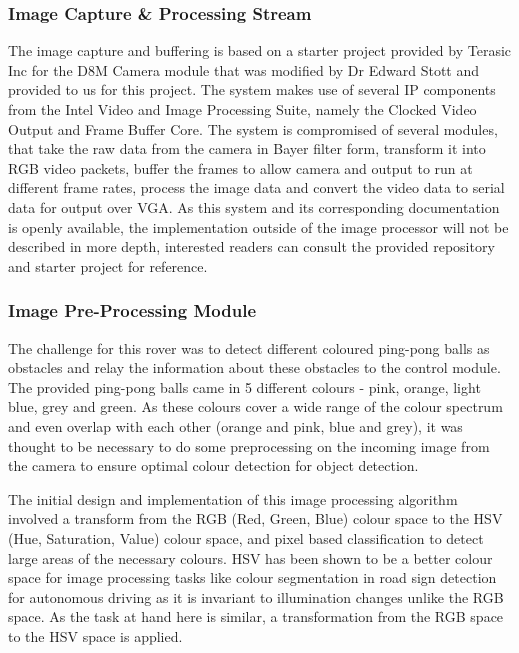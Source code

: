 \documentclass[a4paper]{article}
\begin{document}
\subsubsection{Image Capture \& Processing Stream}

The image capture and buffering is based on a starter project provided
by Terasic Inc for the D8M Camera module that was modified by Dr Edward Stott 
\cite{EEE2Rover} and provided to us for this project. The system makes use of 
several IP components from the Intel Video and Image Processing Suite,
namely the Clocked Video Output and Frame Buffer Core. The system is compromised
of several modules, that take the raw data from the camera in Bayer filter form\cite{TerasicD8MWeb},
transform it into RGB video packets, buffer the frames to allow camera and output
to run at different frame rates, process the image data and convert the video 
data to serial data for output over VGA.\cite{EEE2Rover} As this system and its 
corresponding documentation is openly available, the implementation outside of 
the image processor will not be described in more depth, interested readers can 
consult the provided repository and starter project for reference. 

\subsubsection{Image Pre-Processing Module}

The challenge for this rover was to detect different coloured ping-pong balls as
obstacles and relay the information about these obstacles to the control module. 
The provided ping-pong balls came in 5 different colours - pink, orange, light 
blue, grey and green. As these colours cover a wide range of the colour spectrum
and even overlap with each other (orange and pink, blue and grey), it was thought 
to be necessary to do some preprocessing on the incoming image from the camera 
to ensure optimal colour detection for object detection.  
 


The initial design and implementation of this image processing algorithm involved
a transform from the RGB (Red, Green, Blue) colour space to the HSV (Hue, 
Saturation, Value) colour space, and pixel based classification to detect large
areas of the necessary colours.  HSV has been shown to be a better colour space
for image processing tasks like colour segmentation in road sign detection for 
autonomous driving as it is invariant to illumination changes unlike the RGB 
space.\cite{ali2013performance} As the task at hand here is similar, a transformation
from the RGB space to the HSV space is applied. 
\end{document}
